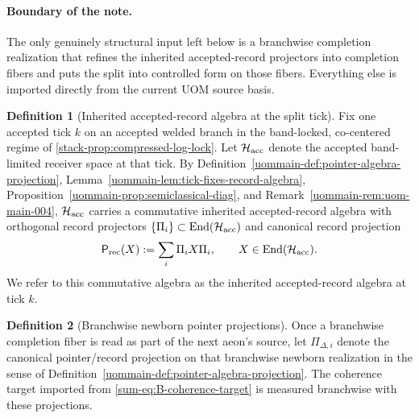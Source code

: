 \documentclass[11pt]{article}
\theoremstyle{definition}
\newtheorem{definition}{Definition}[section]
\theoremstyle{plain}
\theoremstyle{remark}
\newcommand{\Hacc}{\mathcal H_{\rm acc}}
\newcommand{\1}{\mathbf 1}
\begin{document}
\paragraph{Boundary of the note.}
The only genuinely structural input left below is a branchwise completion realization that refines
the inherited accepted-record projectors into completion fibers and puts the split into controlled
form on those fibers.
Everything else is imported directly from the current UOM source basis.

\begin{definition}[Inherited accepted-record algebra at the split tick]
\label{def:splitlift-ledger}
Fix one accepted tick \(k\) on an accepted welded branch in the band-locked, co-centered regime of
\cref{stack-prop:compressed-log-lock}.
Let \(\Hacc\) denote the accepted band-limited receiver space at that tick.
By
Definition~\ref{uommain-def:pointer-algebra-projection},
Lemma~\ref{uommain-lem:tick-fixes-record-algebra},
Proposition~\ref{uommain-prop:semiclassical-diag}, and
Remark~\ref{uommain-rem:uom-main-004},
\(\Hacc\) carries a commutative inherited accepted-record algebra with orthogonal record projectors
\(\{\Pi_i\}\subset\operatorname{End}(\Hacc)\) and canonical record projection
\[
\mathsf P_{\mathrm{rec}}(X):=\sum_i \Pi_i X\Pi_i,
\qquad
X\in\operatorname{End}(\Hacc).
\]
We refer to this commutative algebra as the inherited accepted-record algebra at tick \(k\).
\end{definition}

\begin{definition}[Branchwise newborn pointer projections]
\label{def:splitlift-newborn-pointer}
Once a branchwise completion fiber is read as part of the next aeon's source, let
\(\Pi_{\Delta,i}\) denote the canonical pointer/record projection on that branchwise newborn
realization in the sense of Definition~\ref{uommain-def:pointer-algebra-projection}.
The coherence target imported from \eqref{sum-eq:B-coherence-target} is measured branchwise with
these projections.
\end{definition}
\end{document}
